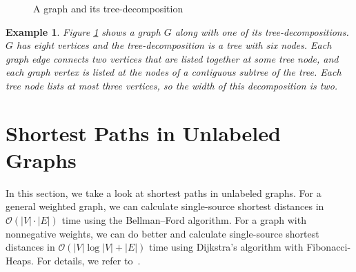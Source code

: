 \documentclass[]{article}
\newtheorem{example}[theorem]{Example}
\numberwithin{equation}{section}
\begin{document}
\begin{figure}[H]
	\centering
	
	\vspace*{5mm}
	
	\caption{A graph and its tree-decomposition}
	\label{fig:treedecomp}
\end{figure}

\begin{example}
	\label{ex:treedecomp}
	Figure \ref{fig:treedecomp} shows a graph $G$ along with one of its tree-decompositions.\\
	
	$G$ has eight vertices and the tree-decomposition is a tree with six nodes. Each graph edge connects two vertices that are listed together at some tree node, and each graph vertex is listed at the nodes of a contiguous subtree of the tree. Each tree node lists at most three vertices, so the width of this decomposition is two.
\end{example}

\clearpage

\section{Shortest Paths in Unlabeled Graphs}
\label{sec:unlabeled}

In this section, we take a look at shortest paths in unlabeled graphs. For a general weighted graph, we can calculate single-source shortest distances in $\mathcal{O}(|V|\cdot |E|)$ time using the Bellman–Ford algorithm. For a graph with nonnegative weights, we can do better and calculate single-source shortest distances in $\mathcal{O}(|V|\log |V| + |E|)$ time using Dijkstra’s algorithm with Fibonacci-Heaps. For details, we refer to~\cite{Amo93}.
\end{document}
